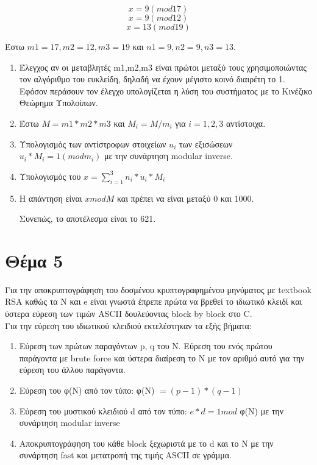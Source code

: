 \documentclass[a4paper, 11pt]{article}
\newcommand{\lt}{\latintext}
\begin{document}
\[ x = 9 (mod 17) \]
\[ x = 9 (mod 12) \]
\[ x = 13 (mod 19) \]

Έστω $ m1 = 17, m2 = 12, m3 = 19$ και $ n1 = 9, n2 = 9, n3 = 13 $.

\begin{enumerate}

\item Έλεγχος αν οι μεταβλητές {\lt m1,m2,m3} είναι πρώτοι μεταξύ τους χρησιμοποιώντας τον αλγόριθμο του ευκλείδη, δηλαδή να έχουν μέγιστο κοινό διαιρέτη το 1. Εφόσον περάσουν τον έλεγχο υπολογίζεται η λύση του συστήματος με το Κινέζικο Θεώρημα Υπολοίπων.

\item Έστω $ M = m1 * m2 * m3 $ και $ M_i = M / m_i $ για $ i = 1,2,3 $ αντίστοιχα.

\item Υπολογισμός των αντίστροφων στοιχείων $ u_i $ των εξισώσεων $ u_i * M_i = 1 (mod m_i) $ με την συνάρτηση {\lt modular inverse}.

\item Υπολογισμός του $ x = \sum_{i=1}^{3} n_i * u_i * M_i $

\item Η απάντηση είναι $ x mod M $ και πρέπει να είναι μεταξύ 0 και 1000.

Συνεπώς, το αποτέλεσμα είναι το 621.

\end{enumerate}

\section*{Θέμα 5}


Για την αποκρυπτογράφηση του δοσμένου κρυπτογραφημένου μηνύματος με {\lt textbook RSA} καθώς τα {\lt N} και {\lt e} είναι γνωστά έπρεπε πρώτα να βρεθεί το ιδιωτικό κλειδί και ύστερα εύρεση των τιμών {\lt ASCII} δουλεύοντας {\lt block by block} στο {\lt C}. \\

Για την εύρεση του ιδιωτικού κλειδιού εκτελέστηκαν τα εξής βήματα:

\begin{enumerate}

\item Εύρεση των πρώτων παραγόντων {\lt p, q} του {\lt N}. Εύρεση του ενός πρώτου παράγοντα με {\lt brute force} και ύστερα διαίρεση το {\lt N} με τον αριθμό αυτό για την εύρεση του άλλου παράγοντα.

\item Εύρεση του φ(Ν) από τον τύπο: φ(Ν) $ = (p - 1) * (q - 1) $

\item Εύρεση του μυστικού κλειδιού {\lt d} από τον τύπο: $ e * d = 1 mod $ φ(Ν) με την συνάρτηση {\lt modular inverse}

\item Αποκρυπτογράφηση του κάθε {\lt block} ξεχωριστά με το {\lt d } και το {\lt N}  με την συνάρτηση {\lt fast} και μετατροπή της τιμής {\lt ASCII} σε γράμμα.

\end{enumerate}
\end{document}
